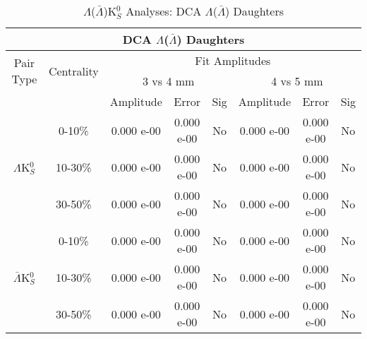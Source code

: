 \documentclass[../AnalysisNoteJBuxton.tex]{subfiles}
\begin{document}
\begin{table}
 \centering
 \begin{tabular}{|c|c|c|c|c||c|c|c|}
  \multicolumn{8}{c}{DCA $\Lambda$($\bar{\Lambda}$) Daughters} \\
  \hline
  \multirow{2}{*}{Pair Type} & \multirow{2}{*}{Centrality} & \multicolumn{6}{c|}{Fit Amplitudes} \\
  \cline{3-8}
   & & \multicolumn{3}{c||}{3 vs 4 mm} & \multicolumn{3}{c|}{4 vs 5 mm} \\
  \hline
   & & Amplitude & Error & Sig & Amplitude & Error & Sig \\
  \hline  
  \multirow{3}{*}{$\Lambda$K$^{0}_{S}$}  
   &  0-10\% & 0.000 e-00 & 0.000 e-00 & No & 0.000 e-00 & 0.000 e-00 & No \\
   & 10-30\% & 0.000 e-00 & 0.000 e-00 & No & 0.000 e-00 & 0.000 e-00 & No \\
   & 30-50\% & 0.000 e-00 & 0.000 e-00 & No & 0.000 e-00 & 0.000 e-00 & No \\
  \hline  
  \multirow{3}{*}{$\bar{\Lambda}$K$^{0}_{S}$}  
   &  0-10\% & 0.000 e-00 & 0.000 e-00 & No & 0.000 e-00 & 0.000 e-00 & No \\
   & 10-30\% & 0.000 e-00 & 0.000 e-00 & No & 0.000 e-00 & 0.000 e-00 & No \\
   & 30-50\% & 0.000 e-00 & 0.000 e-00 & No & 0.000 e-00 & 0.000 e-00 & No \\
  \hline
 \end{tabular}
 \caption{$\Lambda$($\bar{\Lambda}$)K$^{0}_{S}$ Analyses: DCA $\Lambda$($\bar{\Lambda}$) Daughters}
 \label{tab:LamDaughtersDcaLamK0}
\end{table}
\end{document}
